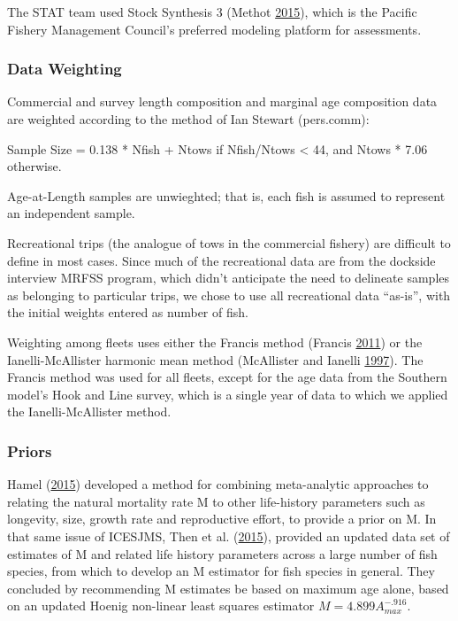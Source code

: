 \documentclass[12pt,]{article}
\begin{document}
The STAT team used Stock Synthesis 3 (Methot
\protect\hyperlink{ref-Methot2015}{2015}), which is the Pacific Fishery
Management Council's preferred modeling platform for assessments.

\subsubsection{Data Weighting}\label{data-weighting}

Commercial and survey length composition and marginal age composition
data are weighted according to the method of Ian Stewart (pers.comm):

Sample Size = 0.138 * Nfish + Ntows if Nfish/Ntows \textless{} 44, and
Ntows * 7.06 otherwise.

Age-at-Length samples are unwieghted; that is, each fish is assumed to
represent an independent sample.

Recreational trips (the analogue of tows in the commercial fishery) are
difficult to define in most cases. Since much of the recreational data
are from the dockside interview MRFSS program, which didn't anticipate
the need to delineate samples as belonging to particular trips, we chose
to use all recreational data ``as-is'', with the initial weights entered
as number of fish.

Weighting among fleets uses either the Francis method (Francis
\protect\hyperlink{ref-Francis2011}{2011}) or the Ianelli-McAllister
harmonic mean method (McAllister and Ianelli
\protect\hyperlink{ref-McAllister1997}{1997}). The Francis method was
used for all fleets, except for the age data from the Southern model's
Hook and Line survey, which is a single year of data to which we applied
the Ianelli-McAllister method.

\subsubsection{\texorpdfstring{Priors
\label{priors}}{Priors }}\label{priors}

Hamel (\protect\hyperlink{ref-Hamel2015}{2015}) developed a method for
combining meta-analytic approaches to relating the natural mortality
rate M to other life-history parameters such as longevity, size, growth
rate and reproductive effort, to provide a prior on M. In that same
issue of ICESJMS, Then et al. (\protect\hyperlink{ref-Then2015}{2015}),
provided an updated data set of estimates of M and related life history
parameters across a large number of fish species, from which to develop
an M estimator for fish species in general. They concluded by
recommending M estimates be based on maximum age alone, based on an
updated Hoenig non-linear least squares estimator
\(M=4.899A_{max }^{-.916}\).
\end{document}
